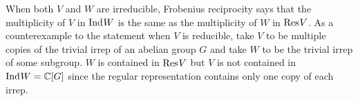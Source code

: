\noindent When both $V$ and $W$ are irreducible, Frobenius reciprocity says that the multiplicity of $V$ in $\text{Ind}_{}^{} {W}$ is the same as the multiplicity of $W$ in $\text{Res}^{}_{} {V}$. As a counterexample to the statement when $V$ is reducible, take $V$ to be multiple copies of the trivial irrep of an abelian group $G$ and take $W$ to be the trivial irrep of some subgroup. $W$ is contained in $\text{Res}^{}_{} {V}$ but $V$ is not contained in $\text{Ind}_{}^{} {W} = \mathbb{C}[G]$ since the regular representation contains only one copy of each irrep.



%

